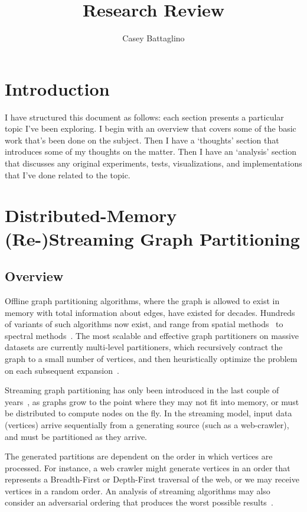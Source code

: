 \documentclass[11pt]{article}
\title{Research Review}
\author{Casey Battaglino}
\date{}
\begin{document}
\maketitle

\section{Introduction}

I have structured this document as follows: each section presents a particular topic I've been exploring. I begin with an overview that covers some of the basic work that's been done on the subject. Then I have a `thoughts' section that introduces some of my thoughts on the matter. Then I have an `analysis' section that discusses any original experiments, tests, visualizations, and implementations that I've done related to the topic. 

\section{Distributed-Memory (Re-)Streaming Graph Partitioning}

\subsection{Overview}

Offline graph partitioning algorithms, where the graph is allowed to exist in memory with total information about edges, have existed for decades. Hundreds of variants of such algorithms now exist, and range from spatial methods~\cite{Gilbert95geometricmesh} to spectral methods~\cite{arora2009expander}. The most scalable and effective graph partitioners on massive datasets are currently multi-level partitioners, which recursively contract the graph to a small number of vertices, and then heuristically optimize the problem on each subsequent expansion~\cite{karypis1998multilevel}. 

Streaming graph partitioning has only been introduced in the last couple of years~\cite{DBLP:journals/corr/abs-1212-1121,Stanton:2012:SGP:2339530.2339722,tsourakakis2012fennel}, as graphs grow to the point where they may not fit into memory, or must be distributed to compute nodes on the fly. In the streaming model, input data (vertices) arrive sequentially from a generating source (such as a web-crawler), and must be partitioned as they arrive.

The generated partitions are dependent on the order in which vertices are processed. For instance, a web crawler might generate vertices in an order that represents a Breadth-First or Depth-First traversal of the web, or we may receive vertices in a random order. An analysis of streaming algorithms may also consider an adversarial ordering that produces the worst possible results~\cite{Stanton:2012:SGP:2339530.2339722}.
\end{document}
